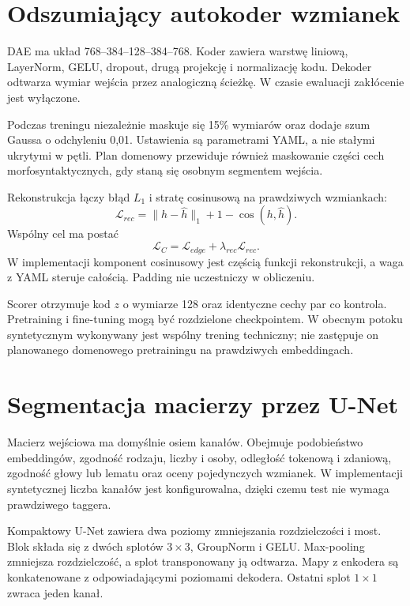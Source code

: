 \section{Odszumiający autokoder wzmianek}
\label{sec:system-dae}

DAE ma układ 768--384--128--384--768. Koder zawiera warstwę liniową, LayerNorm, GELU, dropout, drugą projekcję i normalizację kodu. Dekoder odtwarza wymiar wejścia przez analogiczną ścieżkę. W czasie ewaluacji zakłócenie jest wyłączone.

Podczas treningu niezależnie maskuje się 15\% wymiarów oraz dodaje szum Gaussa o odchyleniu 0,01. Ustawienia są parametrami YAML, a nie stałymi ukrytymi w pętli. Plan domenowy przewiduje również maskowanie części cech morfosyntaktycznych, gdy staną się osobnym segmentem wejścia.

Rekonstrukcja łączy błąd $L_1$ i stratę cosinusową na prawdziwych wzmiankach:
\[
\mathcal{L}_{rec}
=
\lVert h-\hat h\rVert_1
+1-\cos(h,\hat h).
\]
Wspólny cel ma postać
\[
\mathcal{L}_{C}
=\mathcal{L}_{edge}
+\lambda_{rec}\mathcal{L}_{rec}.
\]
W implementacji komponent cosinusowy jest częścią funkcji rekonstrukcji, a waga z YAML steruje całością. Padding nie uczestniczy w obliczeniu.

Scorer otrzymuje kod $z$ o wymiarze 128 oraz identyczne cechy par co kontrola. Pretraining i fine-tuning mogą być rozdzielone checkpointem. W obecnym potoku syntetycznym wykonywany jest wspólny trening techniczny; nie zastępuje on planowanego domenowego pretrainingu na prawdziwych embeddingach.

\section{Segmentacja macierzy przez U-Net}
\label{sec:system-unet}

Macierz wejściowa ma domyślnie osiem kanałów. Obejmuje podobieństwo embeddingów, zgodność rodzaju, liczby i osoby, odległość tokenową i zdaniową, zgodność głowy lub lematu oraz oceny pojedynczych wzmianek. W implementacji syntetycznej liczba kanałów jest konfigurowalna, dzięki czemu test nie wymaga prawdziwego taggera.

Kompaktowy U-Net zawiera dwa poziomy zmniejszania rozdzielczości i most. Blok składa się z dwóch splotów $3\times3$, GroupNorm i GELU. Max-pooling zmniejsza rozdzielczość, a splot transponowany ją odtwarza. Mapy z enkodera są konkatenowane z odpowiadającymi poziomami dekodera. Ostatni splot $1\times1$ zwraca jeden kanał.

